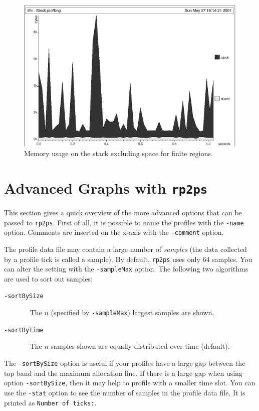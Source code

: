\documentclass[12pt]{book}
\begin{document}
\begin{figure}
\begin{center}
\includegraphics{prof_eks3.ps}
\end{center}
\caption{Memory usage on the stack excluding space for finite regions.}
\label{prof_eks3.fig}
\end{figure}

\section{Advanced Graphs with \texttt{rp2ps}}
This section gives a quick overview of the more advanced options that can
be passed to \texttt{rp2ps}. First of all, it is possible to name the
profiles with the 
%
{\tt -name} option. Comments are inserted on the
x-axis with the 
%
{\tt -comment} option.

The profile data file may contain a large number of \emph{samples}
(the data collected by a profile tick is called a sample). By default,
\texttt{rp2ps} uses only 64 samples. You can alter the setting with the
%
\texttt{-sampleMax} option. The following two algorithms are used to sort
out samples:
\begin{description}
\item[{\tt -sortBySize}]~
  The $n$ (specified by \texttt{-sampleMax}) largest samples are
  shown.
\item[{\tt -sortByTime}]~
  The $n$ samples shown are equally distributed over time (default).
\end{description}
The \texttt{-sortBySize} option is useful if your profiles have a
large gap between the top band and the maximum allocation line.  If
there is a large gap when using option \texttt{-sortBySize}, then it
may help to profile with a smaller time slot. You can use the
%
{\tt -stat} option to see the number of samples in the profile data
file. It is printed as \texttt{Number of ticks:}.
\end{document}
